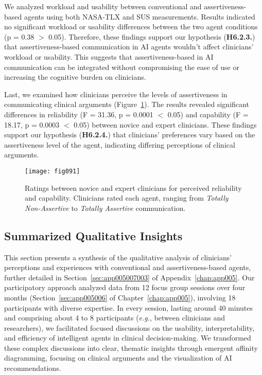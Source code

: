 \textcolor{revised}{We analyzed workload and usability between conventional and assertiveness-based agents using both \ac{NASA-TLX} and \ac{SUS} measurements.
Results indicated no significant workload or usability differences between the two agent conditions (p = 0.38 $>$ 0.05).
Therefore, these findings support our hypothesis ({\bf H6.2.3.}) that assertiveness-based communication in \ac{AI} agents wouldn't affect clinicians' workload or usability.
This suggests that assertiveness-based in \ac{AI} communication can be integrated without compromising the ease of use or increasing the cognitive burden on clinicians.}

Last, we examined how clinicians perceive the levels of assertiveness in communicating clinical arguments (Figure~\ref{fig:fig091}).
The results revealed significant differences in reliability (F = 31.36, p = 0.0001 $<$ 0.05) and capability (F = 18.17, p = 0.0003 $<$ 0.05) between novice and expert clinicians.
These findings support our hypothesis ({\bf H6.2.4.}) that clinicians' preferences vary based on the assertiveness level of the agent, indicating differing perceptions of clinical arguments.

\begin{figure}[htpb]
\centering
\texttt{[image: fig091]}
\caption[]{Ratings between novice and expert clinicians for perceived reliability and capability. Clinicians rated each agent, ranging from {\it Totally Non-Assertive} to {\it Totally Assertive} communication.}
\label{fig:fig091}
\end{figure}

\subsection{Summarized Qualitative Insights}
\label{sec:chap006006003}

\textcolor{revised}{This section presents a synthesis of the qualitative analysis of clinicians' perceptions and experiences with conventional and assertiveness-based agents, further detailed in Section~\ref{sec:app005007003} of Appendix~\ref{chap:app005}.
Our participatory approach analyzed data from 12 focus group sessions over four months (Section~\ref{sec:app005006} of Chapter~\ref{chap:app005}), involving 18 participants with diverse expertise.
In every session, lasting around 40 minutes and comprising about 4 to 8 participants ({\it e.g.}, between clinicians and researchers), we facilitated focused discussions on the usability, interpretability, and efficiency of intelligent agents in clinical decision-making.
We transformed these complex discussions into clear, thematic insights through emergent affinity diagramming, focusing on clinical arguments and the visualization of \ac{AI} recommendations.}

